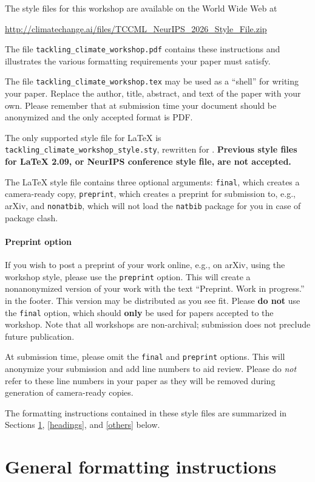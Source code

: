 \documentclass{article}
\begin{document}
The style files for this workshop are available on
the World Wide Web at
\begin{center}
  \url{http://climatechange.ai/files/TCCML_NeurIPS_2026_Style_File.zip} 
\end{center}
The file \verb+tackling_climate_workshop.pdf+ contains these instructions and illustrates the
various formatting requirements your paper must satisfy.

The file \verb+tackling_climate_workshop.tex+ may be used as a “shell” for writing your paper. Replace the author, title, abstract, and text of the paper with your own. Please remember that at submission time your document should be anonymized and the only accepted format is PDF.

The only supported style file for \LaTeX{} is \verb+tackling_climate_workshop_style.sty+,
rewritten for \LaTeXe{}.  \textbf{Previous style files for \LaTeX{} 2.09, or NeurIPS conference style file, are not accepted.}

The \LaTeX{} style file contains three optional arguments: \verb+final+, which
creates a camera-ready copy, \verb+preprint+, which creates a preprint for
submission to, e.g., arXiv, and \verb+nonatbib+, which will not load the
\verb+natbib+ package for you in case of package clash.

\paragraph{Preprint option}
If you wish to post a preprint of your work online, e.g., on arXiv, using the workshop style, please use the \verb+preprint+ option. This will create a
nonanonymized version of your work with the text ``Preprint. Work in progress.''
in the footer. This version may be distributed as you see fit. Please \textbf{do
  not} use the \verb+final+ option, which should \textbf{only} be used for
papers accepted to the workshop. Note that all workshops are non-archival; submission does not preclude future publication.

At submission time, please omit the \verb+final+ and \verb+preprint+
options. This will anonymize your submission and add line numbers to aid
review. Please do \emph{not} refer to these line numbers in your paper as they
will be removed during generation of camera-ready copies.

The formatting instructions contained in these style files are summarized in
Sections \ref{gen_inst}, \ref{headings}, and \ref{others} below.

\section{General formatting instructions}
\label{gen_inst}
\end{document}
